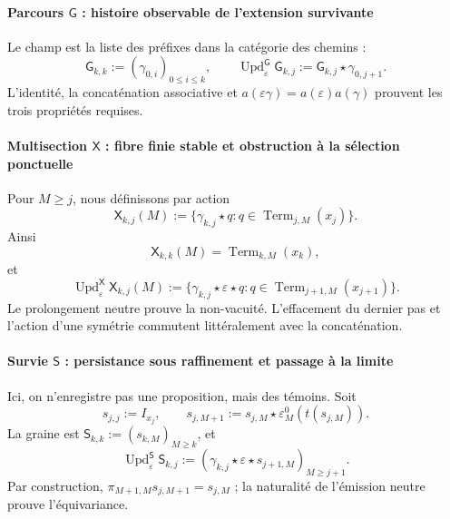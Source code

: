 \paragraph{Parcours \(\mathsf G\) : histoire observable de l'extension survivante}
Le champ est la liste des préfixes dans la catégorie des chemins :
\begin{equation}
\label{eq:pdfv2-terminal-update-g}
 \mathsf G_{k,k}:=(\gamma_{0,i})_{0\leq i\leq k},\qquad
 \operatorname{Upd}^{\mathsf G}_{\varepsilon}\mathsf G_{k,j}
 :=\mathsf G_{k,j}\star\gamma_{0,j+1}.
\end{equation}
L'identité, la concaténation associative et \(a(\varepsilon\gamma)=a(\varepsilon)a(\gamma)\) prouvent les trois propriétés requises.

\paragraph{Multisection \(\mathsf X\) : fibre finie stable et obstruction à la sélection ponctuelle}
Pour \(M\geq j\), nous définissons par action
\begin{equation}
\label{eq:pdfv2-terminal-multiseccion-interna}
 \mathsf X_{k,j}(M):=
 \{\gamma_{k,j}\star q:
 q\in\operatorname{Term}_{j,M}(x_j)\}.
\end{equation}
Ainsi
\[
 \mathsf X_{k,k}(M)=\operatorname{Term}_{k,M}(x_k),
\]
et
\begin{equation}
\label{eq:pdfv2-terminal-update-x}
 \operatorname{Upd}^{\mathsf X}_{\varepsilon}\mathsf X_{k,j}(M)
 :=
 \{\gamma_{k,j}\star\varepsilon\star q:
 q\in\operatorname{Term}_{j+1,M}(x_{j+1})\}.
\end{equation}
Le prolongement neutre prouve la non-vacuité. L'effacement du dernier pas et l'action d'une symétrie commutent littéralement avec la concaténation.

\paragraph{Survie \(\mathsf S\) : persistance sous raffinement et passage à la limite}
Ici, on n'enregistre pas une proposition, mais des témoins. Soit
\begin{equation}
\label{eq:pdfv2-terminal-testigo-neutro}
 s_{j,j}:=I_{x_j},\qquad
 s_{j,M+1}:=s_{j,M}\star
 \varepsilon_M^0(t(s_{j,M})).
\end{equation}
La graine est \(\mathsf S_{k,k}:=(s_{k,M})_{M\geq k}\), et
\begin{equation}
\label{eq:pdfv2-terminal-update-s}
 \operatorname{Upd}^{\mathsf S}_{\varepsilon}\mathsf S_{k,j}
 :=(\gamma_{k,j}\star\varepsilon\star s_{j+1,M})_{M\geq j+1}.
\end{equation}
Par construction, \(\pi_{M+1,M}s_{j,M+1}=s_{j,M}\) ; la naturalité de l'émission neutre prouve l'équivariance.

